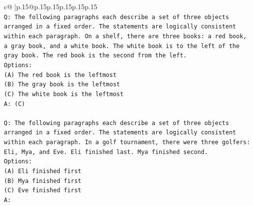 \documentclass{article}
\begin{document}
{\begin{supertabular}{c@{$\;$}|p{.15\linewidth}@{}p{.15\linewidth}p{.15\linewidth}p{.15\linewidth}p{.15\linewidth}p{.15\linewidth}}
{{{\\ 
\texttt{Q: The following paragraphs each describe a set of three objects arranged in a fixed order. The statements are logically consistent within each paragraph. On a shelf, there are three books: a red book, a gray book, and a white book. The white book is to the left of the gray book. The red book is the second from the left.} \\
\texttt{Options:} \\
\texttt{(A) The red book is the leftmost} \\
\texttt{(B) The gray book is the leftmost} \\
\texttt{(C) The white book is the leftmost} \\
\texttt{A: (C)} \\
\\ 
\texttt{Q: The following paragraphs each describe a set of three objects arranged in a fixed order. The statements are logically consistent within each paragraph. In a golf tournament, there were three golfers: Eli, Mya, and Eve. Eli finished last. Mya finished second.} \\
\texttt{Options:} \\
\texttt{(A) Eli finished first} \\
\texttt{(B) Mya finished first} \\
\texttt{(C) Eve finished first} \\
\texttt{A:} \\
            }
        }
    }
     \\ \\


\end{supertabular}}
\end{document}
